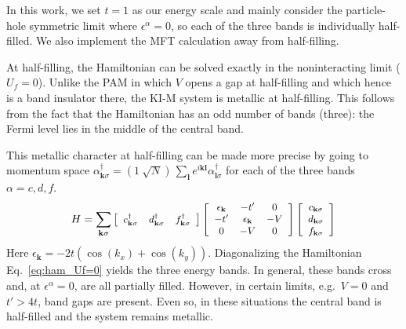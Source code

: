 \documentclass[pra,letterpaper,10pt,twocolumn]{revtex4}
\begin{document}
In this work, we set $t=1$ as our energy scale and mainly consider the
particle-hole symmetric limit where $\epsilon^\alpha=0$, so each of the
three bands is individually half-filled. We also implement the MFT
calculation away from half-filling. 

At half-filling, the
Hamiltonian can be solved exactly in the noninteracting limit ($U_f=0$).
Unlike the PAM in which $V$ opens a gap at half-filling and which hence
is a band insulator there, the KI-M system is metallic at half-filling.
This follows from the fact that the Hamiltonian has an odd number of
bands (three): the Fermi level lies in the middle of the
central band.

This metallic character at half-filling can be made more precise
by going to momentum space 
$\alpha^{\dagger}_{\textbf{k}\sigma}=
( 1 \ \sqrt{N}) \,
\sum_\textbf{l}
e^{i\textbf{kl}}\alpha^{\dagger}_{\textbf{l}\sigma}$ for each of the three
bands $\alpha=c,d,f$.
\begin{align}
 \begin{small}
  H=\sum_{\textbf{k}\sigma}
  \left[ {\begin{array}{ccc}
   c^{\dagger}_{\textbf{k}\sigma} & d^{\dagger}_{\textbf{k}\sigma} & f^{\dagger}_{\textbf{k}\sigma} \\
  \end{array} } \right]
  \left[ {\begin{array}{ccc}
   \epsilon_{\textbf{k}} & -t' & 0\\
   -t' & \epsilon_{\textbf{k}} & -V\\
   0 & -V & 0\\
  \end{array} } \right]
  \left[ {\begin{array}{c}
   c_{\textbf{k}\sigma} \\ d_{\textbf{k}\sigma} \\ f_{\textbf{k}\sigma} \\
  \end{array} } \right]
 \end{small}
\label{eq:ham_Uf=0}
\end{align}
Here $\epsilon_{\textbf{k}}=-2t(\cos(k_x)+\cos(k_y))$. 
Diagonalizing the Hamiltonian Eq.~\ref{eq:ham_Uf=0} yields the three
energy bands.  In general, these bands cross and, at $\epsilon^\alpha=0$, are
all partially filled.  However, in certain limits, e.g.~$V=0$ and
$t'>4t$, band gaps are present.  Even so, in these
situations the central band is half-filled and the system remains
metallic.
\end{document}
